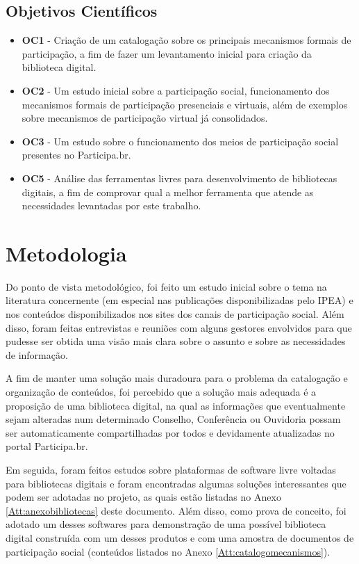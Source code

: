 \subsection*{Objetivos Científicos}

\begin{itemize}
\item \textbf{OC1} - Criação de um catalogação sobre os principais mecanismos formais de participação, a fim de fazer um levantamento inicial para criação da biblioteca digital.
\item \textbf{OC2} - Um estudo inicial sobre a participação social, funcionamento dos mecanismos formais de participação presenciais e virtuais, além de exemplos sobre mecanismos de participação virtual já consolidados.
\item \textbf{OC3} - Um estudo sobre o funcionamento dos meios de participação social presentes no Participa.br.
\item \textbf{OC5} - Análise das ferramentas livres para desenvolvimento de bibliotecas digitais, a fim de comprovar qual a melhor ferramenta que atende as necessidades levantadas por este trabalho.
\end{itemize}
	 	

\section{Metodologia}

Do ponto de vista metodológico, foi feito um estudo inicial sobre o tema na literatura concernente (em especial nas publicações disponibilizadas pelo IPEA) e nos conteúdos disponibilizados nos sites dos canais de participação social. Além disso, foram feitas entrevistas e reuniões com alguns gestores envolvidos para que pudesse ser obtida uma visão mais clara sobre o assunto e sobre as necessidades de informação.

A fim de manter uma solução mais duradoura para o problema da catalogação e organização de conteúdos, foi percebido que a solução mais adequada é a proposição de uma biblioteca digital, na qual as informações que eventualmente sejam alteradas num determinado Conselho, Conferência ou Ouvidoria possam ser automaticamente compartilhadas por todos e devidamente atualizadas no portal Participa.br.

Em seguida, foram feitos estudos sobre plataformas de software livre voltadas para bibliotecas digitais e foram encontradas algumas soluções interessantes que podem ser adotadas no projeto, as quais estão listadas no Anexo \ref{Att:anexobibliotecas} deste documento. Além disso, como prova de conceito, foi adotado um desses softwares para demonstração de uma possível biblioteca digital construída com um desses produtos e com uma amostra de documentos de participação social (conteúdos listados no Anexo \ref{Att:catalogomecanismos}).

